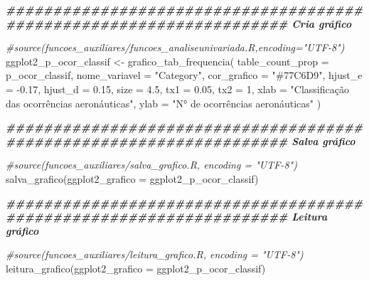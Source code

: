 \documentclass[
]{article}
\newenvironment{Shaded}{\begin{snugshade}}{\end{snugshade}}
\newcommand{\AttributeTok}[1]{\textcolor[rgb]{0.77,0.63,0.00}{#1}}
\newcommand{\CommentTok}[1]{\textcolor[rgb]{0.56,0.35,0.01}{\textit{#1}}}
\newcommand{\DecValTok}[1]{\textcolor[rgb]{0.00,0.00,0.81}{#1}}
\newcommand{\DocumentationTok}[1]{\textcolor[rgb]{0.56,0.35,0.01}{\textbf{\textit{#1}}}}
\newcommand{\FloatTok}[1]{\textcolor[rgb]{0.00,0.00,0.81}{#1}}
\newcommand{\FunctionTok}[1]{\textcolor[rgb]{0.00,0.00,0.00}{#1}}
\newcommand{\NormalTok}[1]{#1}
\newcommand{\OtherTok}[1]{\textcolor[rgb]{0.56,0.35,0.01}{#1}}
\newcommand{\SpecialCharTok}[1]{\textcolor[rgb]{0.00,0.00,0.00}{#1}}
\newcommand{\StringTok}[1]{\textcolor[rgb]{0.31,0.60,0.02}{#1}}
\begin{document}
\begin{Shaded}
\begin{Highlighting}[]
\DocumentationTok{\#\#\#\#\#\#\#\#\#\#\#\#\#\#\#\#\#\#\#\#\#\#\#\#\#\#\#\#\#\#\#\#\#\#\#\#\#\#\#\#\#\#\#\#\#\#\#\#\#\#\#\#\#\#\#\#\#\#\#\#\#\#\#\#\#\#\#\# Cria gráfico}

\CommentTok{\#source(\textquotesingle{}funcoes\_auxiliares/funcoes\_analiseunivariada.R\textquotesingle{},encoding="UTF{-}8")}
\NormalTok{ggplot2\_p\_ocor\_classif }\OtherTok{\textless{}{-}} \FunctionTok{grafico\_tab\_frequencia}\NormalTok{(}
    \AttributeTok{table\_count\_prop =}\NormalTok{ p\_ocor\_classif,}
    \AttributeTok{nome\_variavel =} \StringTok{"Category"}\NormalTok{,}
    \AttributeTok{cor\_grafico =} \StringTok{"\#77C6D9"}\NormalTok{,}
    \AttributeTok{hjust\_e =} \SpecialCharTok{{-}}\FloatTok{0.17}\NormalTok{,}
    \AttributeTok{hjust\_d =} \FloatTok{0.15}\NormalTok{,}
    \AttributeTok{size =} \FloatTok{4.5}\NormalTok{,}
    \AttributeTok{tx1 =} \FloatTok{0.05}\NormalTok{,}
    \AttributeTok{tx2 =} \DecValTok{1}\NormalTok{,}
    \AttributeTok{xlab =} \StringTok{"Classificação das ocorrências aeronáuticas"}\NormalTok{,}
    \AttributeTok{ylab =} \StringTok{"N° de ocorrências aeronáuticas"}
\NormalTok{)}

\DocumentationTok{\#\#\#\#\#\#\#\#\#\#\#\#\#\#\#\#\#\#\#\#\#\#\#\#\#\#\#\#\#\#\#\#\#\#\#\#\#\#\#\#\#\#\#\#\#\#\#\#\#\#\#\#\#\#\#\#\#\#\#\#\#\#\#\#\#\#\#\# Salva gráfico}

\CommentTok{\#source(\textquotesingle{}funcoes\_auxiliares/salva\_grafico.R\textquotesingle{}, encoding = "UTF{-}8")}
\FunctionTok{salva\_grafico}\NormalTok{(}\AttributeTok{ggplot2\_grafico =}\NormalTok{ ggplot2\_p\_ocor\_classif)}

\DocumentationTok{\#\#\#\#\#\#\#\#\#\#\#\#\#\#\#\#\#\#\#\#\#\#\#\#\#\#\#\#\#\#\#\#\#\#\#\#\#\#\#\#\#\#\#\#\#\#\#\#\#\#\#\#\#\#\#\#\#\#\#\#\#\#\#\#\#\#\#\# Leitura gráfico}

\CommentTok{\#source(\textquotesingle{}funcoes\_auxiliares/leitura\_grafico.R\textquotesingle{}, encoding = "UTF{-}8")}
\FunctionTok{leitura\_grafico}\NormalTok{(}\AttributeTok{ggplot2\_grafico =}\NormalTok{ ggplot2\_p\_ocor\_classif)}
\end{Highlighting}
\end{Shaded}
\end{document}
